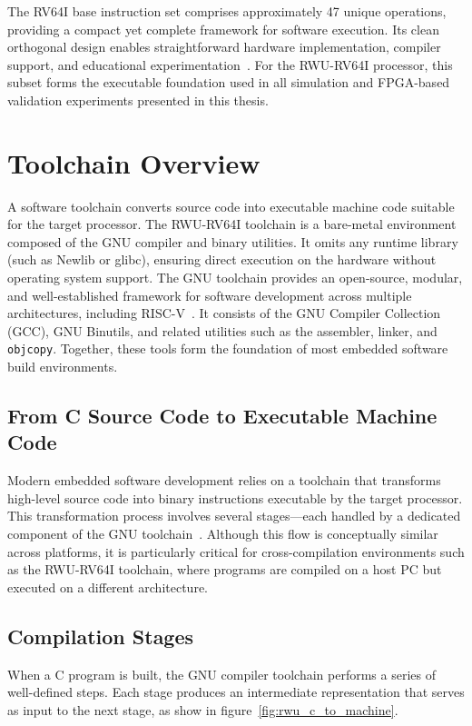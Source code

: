 The RV64I base instruction set comprises approximately 47 unique operations, providing a compact yet complete framework for software execution.  
Its clean orthogonal design enables straightforward hardware implementation, compiler support, and educational experimentation~\cite{patterson2017riscv}.  
For the RWU-RV64I processor, this subset forms the executable foundation used in all simulation and FPGA-based validation experiments presented in this thesis.


\section{Toolchain Overview}
A software toolchain converts source code into executable machine code suitable for the target processor.  
The RWU-RV64I toolchain is a bare-metal environment composed of the GNU compiler and binary utilities.  
It omits any runtime library (such as Newlib or glibc), ensuring direct execution on the hardware without operating system support.
The GNU toolchain provides an open-source, modular, and well-established framework for software development across multiple architectures, including RISC-V~\cite{gcc,binutils}.  
It consists of the GNU Compiler Collection (GCC), GNU Binutils, and related utilities such as the assembler, linker, and \texttt{objcopy}.  
Together, these tools form the foundation of most embedded software build environments.

\subsection{From C Source Code to Executable Machine Code}
Modern embedded software development relies on a toolchain that transforms high-level source code into binary instructions executable by the target processor.  
This transformation process involves several stages—each handled by a dedicated component of the GNU toolchain~\cite{gcc}.  
Although this flow is conceptually similar across platforms, it is particularly critical for cross-compilation environments such as the RWU-RV64I toolchain, where programs are compiled on a host PC but executed on a different architecture.

\subsection{Compilation Stages}
When a C program is built, the GNU compiler toolchain performs a series of well-defined steps.  
Each stage produces an intermediate representation that serves as input to the next stage, as show in figure~\ref{fig:rwu_c_to_machine}.

